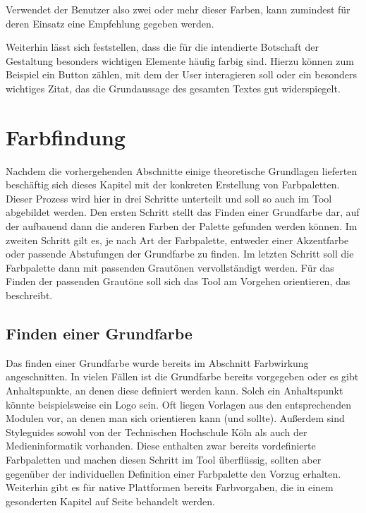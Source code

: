 Verwendet der Benutzer also zwei oder mehr dieser Farben, kann zumindest für deren Einsatz eine Empfehlung gegeben werden.

Weiterhin lässt sich feststellen, dass die für die intendierte Botschaft der Gestaltung besonders wichtigen Elemente häufig farbig sind. Hierzu können zum Beispiel ein Button zählen, mit dem der User interagieren soll oder ein besonders wichtiges Zitat, das die Grundaussage des gesamten Textes gut widerspiegelt.


\section{Farbfindung}

Nachdem die vorhergehenden Abschnitte einige theoretische Grundlagen lieferten beschäftig sich dieses Kapitel mit der konkreten Erstellung von Farbpaletten. Dieser Prozess wird hier in drei Schritte unterteilt und soll so auch im Tool abgebildet werden.
Den ersten Schritt stellt das Finden einer Grundfarbe dar, auf der aufbauend dann die anderen Farben der Palette gefunden werden können.
Im zweiten Schritt gilt es, je nach Art der Farbpalette, entweder einer Akzentfarbe oder passende Abstufungen der Grundfarbe zu finden. Im letzten Schritt soll die Farbpalette dann mit passenden Grautönen vervollständigt werden. Für das Finden der passenden Grautöne soll sich das Tool am Vorgehen orientieren, das \cite{elizabeth2016simple} beschreibt.

\subsection{Finden einer Grundfarbe}

Das finden einer Grundfarbe wurde bereits im Abschnitt Farbwirkung angeschnitten. In vielen Fällen ist die Grundfarbe bereits vorgegeben oder es gibt Anhaltspunkte, an denen diese definiert werden kann. Solch ein Anhaltspunkt könnte beispielsweise ein Logo sein.
Oft liegen Vorlagen aus den entsprechenden Modulen vor, an denen man sich orientieren kann (und sollte). Außerdem sind Styleguides sowohl von der Technischen Hochschule Köln als  auch der Medieninformatik vorhanden. Diese enthalten zwar bereits vordefinierte Farbpaletten und machen diesen Schritt im Tool überflüssig, sollten aber gegenüber der individuellen Definition einer Farbpalette den Vorzug erhalten. Weiterhin gibt es für native Plattformen bereits Farbvorgaben, die in einem gesonderten Kapitel auf Seite \pageref{androidios} behandelt werden.

